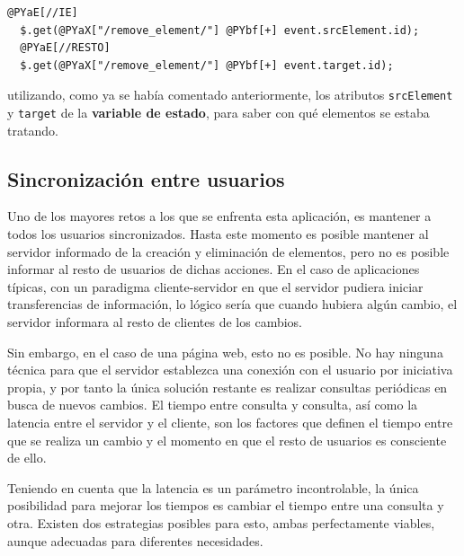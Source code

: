 \begin{Verbatim}[commandchars=@\[\]]
  @PYaE[//IE]
  $.get(@PYaX["/remove_element/"] @PYbf[+] event.srcElement.id);
  @PYaE[//RESTO]
  $.get(@PYaX["/remove_element/"] @PYbf[+] event.target.id);
\end{Verbatim}


utilizando, como ya se había comentado anteriormente, los atributos \texttt{srcElement} y \texttt{target} de la \textbf{variable de estado}, para saber con qué elementos se estaba tratando.

\newpage
\subsection{Sincronización entre usuarios} %
\label{ssub:sincronizacion_entre_usuarios}

Uno de los mayores retos a los que se enfrenta esta aplicación, es mantener a todos los usuarios sincronizados. Hasta este momento es posible mantener al servidor informado de la creación y eliminación de elementos, pero no es posible informar al resto de usuarios de dichas acciones. En el caso de aplicaciones típicas, con un paradigma cliente-servidor en que el servidor pudiera iniciar transferencias de información, lo lógico sería que cuando hubiera algún cambio, el servidor informara al resto de clientes de los cambios.

Sin embargo, en el caso de una página web, esto no es posible. No hay ninguna técnica para que el servidor establezca una conexión con el usuario por iniciativa propia, y por tanto la única solución restante es realizar consultas periódicas en busca de nuevos cambios. El tiempo entre consulta y consulta, así como la latencia entre el servidor y el cliente, son los factores que definen el tiempo entre que se realiza un cambio y el momento en que el resto de usuarios es consciente de ello.

Teniendo en cuenta que la latencia es un parámetro incontrolable, la única posibilidad para mejorar los tiempos es cambiar el tiempo entre una consulta y otra. Existen dos estrategias posibles para esto, ambas perfectamente viables, aunque adecuadas para diferentes necesidades.

